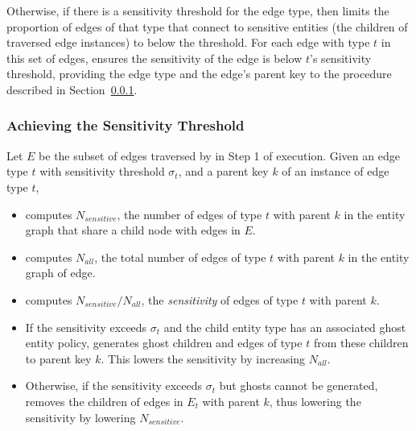 \begin{enumerate}

        Otherwise, if there is a sensitivity threshold for the edge type, then \sys{} limits the
        proportion of edges of that type that connect to sensitive entities (the children of
        traversed edge instances) to below the threshold. 
        For each edge with type $t$ in this set of edges, \sys{} ensures the
        sensitivity of the edge is below $t$'s sensitivity threshold, providing the edge type and the edge's
        parent key to the procedure described in Section~\ref{sensitivity_algo}. 
\end{enumerate}

\subsubsection{Achieving the Sensitivity Threshold}
\label{sensitivity_algo}
Let $E$ be the subset of edges traversed by \sys{} in Step 1 of execution. 
Given an edge type $t$ with sensitivity threshold $\sigma_t$, and a parent key $k$ of an instance of
edge type $t$, 
    \begin{itemize}
        \item \sys{} computes $N_{sensitive}$, the number of edges of type $t$ with parent $k$ in the entity graph that share 
            a child node with edges in $E$.
        \item \sys{} computes $N_{all}$, the total number of edges of type $t$ with parent $k$
            in the entity graph of edge.
        \item \sys{} computes $N_{sensitive}/N_{all}$, the \emph{sensitivity} of edges of type $t$
            with parent $k$.
        \item If the sensitivity exceeds $\sigma_t$ and the child entity type has an associated ghost entity policy, \sys{}
            generates ghost children and edges of type $t$ from these children to parent
            key $k$. This lowers the sensitivity by increasing $N_{all}$.
        \item Otherwise, if the sensitivity exceeds $\sigma_t$ but ghosts cannot be generated,
            \sys{} removes the children of edges in $E_t$ with parent $k$, thus lowering the
            sensitivity by lowering $N_{sensitive}$.
    \end{itemize}

